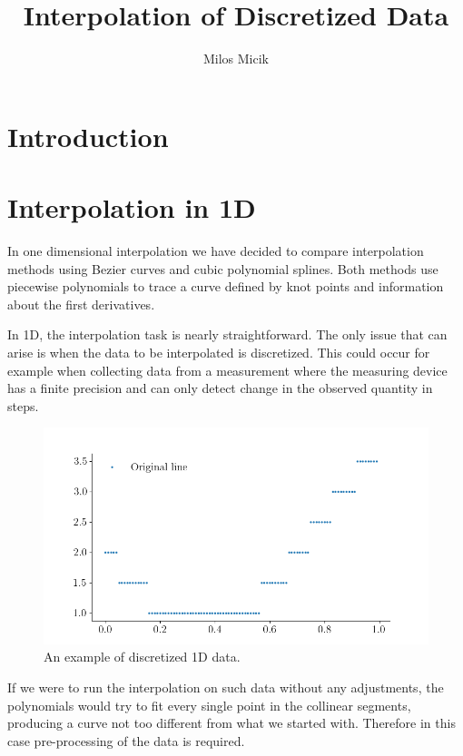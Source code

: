 \documentclass[a4paper,10pt]{report}
\title{Interpolation of Discretized Data}
\author{Milos Micik}
\begin{document}
\maketitle

\begin{abstract}
\end{abstract}

\chapter{Introduction}

\chapter{Interpolation in 1D}
In one dimensional interpolation we have decided to compare interpolation methods using Bezier curves and cubic polynomial splines. Both methods use piecewise polynomials to trace a curve defined by knot points and information about the first derivatives.


In 1D, the interpolation task is nearly straightforward. The only issue that can arise is when the data to be interpolated is discretized. This could occur for example when collecting data from a measurement where the measuring device has a finite precision and can only detect change in the observed quantity in steps.
\begin{figure}[h]
 \centering
 \includegraphics[width=.6\textwidth]{../images/1D_Function.png}
 \caption{An example of discretized 1D data.}
 \label{fig:1D_fun}
\end{figure}

If we were to run the interpolation on such data without any adjustments, the polynomials would try to fit every single point in the collinear segments, producing a curve not too different from what we started with. Therefore in this case pre-processing of the data is required.
\end{document}
